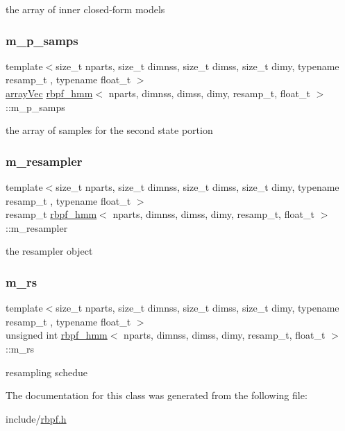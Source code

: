 the array of inner closed-\/form models \mbox{\label{classrbpf__hmm_a6caeb30aae73ee88f4131103dbf1f84b}} 
\subsubsection{\texorpdfstring{m\+\_\+p\+\_\+samps}{m\_p\_samps}}
{\footnotesize\ttfamily template$<$size\+\_\+t nparts, size\+\_\+t dimnss, size\+\_\+t dimss, size\+\_\+t dimy, typename resamp\+\_\+t , typename float\+\_\+t $>$ \\
\hyperlink{classrbpf__hmm_a2154906d47b4eb987fe7c238d1aace0a}{array\+Vec} \hyperlink{classrbpf__hmm}{rbpf\+\_\+hmm}$<$ nparts, dimnss, dimss, dimy, resamp\+\_\+t, float\+\_\+t $>$\+::m\+\_\+p\+\_\+samps\hspace{0.3cm}{\ttfamily [private]}}

the array of samples for the second state portion \mbox{\label{classrbpf__hmm_ab298b91a0da6b09197915e337ca2b8a1}} 
\subsubsection{\texorpdfstring{m\+\_\+resampler}{m\_resampler}}
{\footnotesize\ttfamily template$<$size\+\_\+t nparts, size\+\_\+t dimnss, size\+\_\+t dimss, size\+\_\+t dimy, typename resamp\+\_\+t , typename float\+\_\+t $>$ \\
resamp\+\_\+t \hyperlink{classrbpf__hmm}{rbpf\+\_\+hmm}$<$ nparts, dimnss, dimss, dimy, resamp\+\_\+t, float\+\_\+t $>$\+::m\+\_\+resampler\hspace{0.3cm}{\ttfamily [private]}}

the resampler object \mbox{\label{classrbpf__hmm_ae4f15e5a4f31eefa789fbffd86e78a6b}} 
\subsubsection{\texorpdfstring{m\+\_\+rs}{m\_rs}}
{\footnotesize\ttfamily template$<$size\+\_\+t nparts, size\+\_\+t dimnss, size\+\_\+t dimss, size\+\_\+t dimy, typename resamp\+\_\+t , typename float\+\_\+t $>$ \\
unsigned int \hyperlink{classrbpf__hmm}{rbpf\+\_\+hmm}$<$ nparts, dimnss, dimss, dimy, resamp\+\_\+t, float\+\_\+t $>$\+::m\+\_\+rs\hspace{0.3cm}{\ttfamily [private]}}

resampling schedue 

The documentation for this class was generated from the following file\+:\begin{DoxyCompactItemize}
\item 
include/\hyperlink{rbpf_8h}{rbpf.\+h}\end{DoxyCompactItemize}

